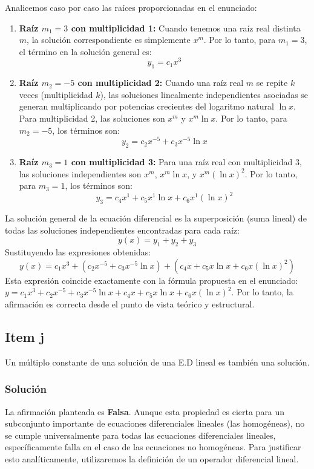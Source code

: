 \documentclass[a4paper]{article}
\begin{document}
Analicemos caso por caso las raíces proporcionadas en el enunciado:
\begin{enumerate}
    \item \textbf{Raíz $m_1 = 3$ con multiplicidad 1:}
    Cuando tenemos una raíz real distinta $m$, la solución correspondiente es simplemente $x^m$. Por lo tanto, para $m_1 = 3$, el término en la solución general es:
    $$
    y_1 = c_1 x^3
    $$
    \item \textbf{Raíz $m_2 = -5$ con multiplicidad 2:}
    Cuando una raíz real $m$ se repite $k$ veces (multiplicidad $k$), las soluciones linealmente independientes asociadas se generan multiplicando por potencias crecientes del logaritmo natural $\ln x$. Para multiplicidad 2, las soluciones son $x^m$ y $x^m \ln x$. Por lo tanto, para $m_2 = -5$, los términos son:
    $$
    y_2 = c_2 x^{-5} + c_3 x^{-5} \ln x
    $$
    \item \textbf{Raíz $m_3 = 1$ con multiplicidad 3:}
    Para una raíz real con multiplicidad 3, las soluciones independientes son $x^m$, $x^m \ln x$, y $x^m (\ln x)^2$. Por lo tanto, para $m_3 = 1$, los términos son:
    $$
    y_3 = c_4 x^1 + c_5 x^1 \ln x + c_6 x^1 (\ln x)^2
    $$
\end{enumerate}

La solución general de la ecuación diferencial es la superposición (suma lineal) de todas las soluciones independientes encontradas para cada raíz:
$$
y(x) = y_1 + y_2 + y_3
$$
Sustituyendo las expresiones obtenidas:
$$
y(x) = c_1 x^3 + (c_2 x^{-5} + c_3 x^{-5} \ln x) + (c_4 x + c_5 x \ln x + c_6 x (\ln x)^2)
$$
Esta expresión coincide exactamente con la fórmula propuesta en el enunciado: $y= c_1 x^3 + c_2 x^{-5} + c_3 x^{-5} \ln x+ c_4 x+ c_5 x \ln x+ c_6 x(\ln x)^2$. Por lo tanto, la afirmación es correcta desde el punto de vista teórico y estructural.

\subsection{Item j}
Un múltiplo constante de una solución de una E.D lineal es también una solución.

\subsubsection{Solución}
La afirmación planteada es \textbf{Falsa}. Aunque esta propiedad es cierta para un subconjunto importante de ecuaciones diferenciales lineales (las homogéneas), no se cumple universalmente para todas las ecuaciones diferenciales lineales, específicamente falla en el caso de las ecuaciones no homogéneas. Para justificar esto analíticamente, utilizaremos la definición de un operador diferencial lineal.
\end{document}
